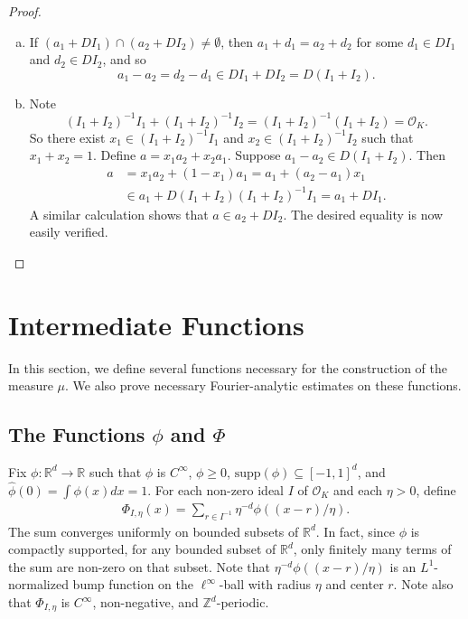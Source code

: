 \documentclass{amsart}
\numberwithin{equation}{section}
\theoremstyle{definition}
\theoremstyle{definition}
\def\RR{\mathbb{R}}
\def\ZZ{\mathbb{Z}}
\def\supp{\mathrm{supp}}
\newcommand{\OK}{\mathcal{O}_K}
\begin{document}
\begin{proof}
\mbox{}\\
\begin{enumerate}[(a)]
    \item 
If $(a_1 + D I_1) \cap (a_2 + D I_2) \neq \emptyset$, then $a_1 + d_1 = a_2 + d_2$ for some $d_1 \in DI_1$ and $d_2 \in DI_2$, and so 
$$
a_1 - a_2 = d_2 - d_1 \in DI_1 + DI_2 = D(I_1 + I_2). 
$$
\item 
Note 
$$
(I_1 + I_2)^{-1}I_1 + (I_1 + I_2)^{-1}I_2 = (I_1 + I_2)^{-1} (I_1 + I_2) = \OK.$$ 
So there exist $x_1 \in (I_1 + I_2)^{-1}I_1$ and $x_2 \in (I_1 + I_2)^{-1}I_2$ such that $x_1+x_2=1$. 
Define $a = x_1a_2 + x_2a_1$. 
Suppose $a_1 - a_2 \in D(I_1 + I_2)$. 
Then 
\begin{align*}
a &= x_1a_2 + (1-x_1)a_1 = a_1 + (a_2 - a_1)x_1 
\\
&\in
a_1 + D(I_1 + I_2)(I_1 + I_2)^{-1}I_1
=
a_1 + DI_1. 
\end{align*}
A similar calculation shows that $a \in a_2 + DI_2$. The desired equality is now easily verified.
\end{enumerate}
\end{proof}





\section{Intermediate  Functions}\label{sec_Single-
Scale}

In this section, we define several functions necessary for the construction of the measure $\mu$. We also prove necessary Fourier-analytic estimates on these functions. 





\subsection{The Functions \texorpdfstring{$\phi$}{phi} and \texorpdfstring{$\Phi$}{Phi}}


Fix $\phi: \RR^d \to \RR$ such that $\phi$ is $C^{\infty}$, $\phi \geq 0$, $\supp(\phi) \subseteq [-1,1]^d$, and 
$\widehat{\phi}(0) = \int \phi(x) dx = 1$. For each non-zero ideal $I$ of $\OK$ and each $\eta > 0$, define 
\begin{align}\label{Phi defn}
\Phi_{I,\eta}(x) = \sum_{r \in I^{-1}} \eta^{-d} \phi((x-r)/\eta). 
\end{align}
The sum converges uniformly on bounded subsets of $\RR^d$. 
In fact, since $\phi$ is compactly supported, for any bounded subset of $\RR^d$, only finitely many terms of the sum are non-zero on that subset. 
Note that $\eta^{-d} \phi ((x-r)/\eta)$ is an $L^1$-normalized bump function on the 
$\ell^{\infty}$-ball with radius $\eta$ and center $r$. 
Note also that $\Phi_{I,\eta}$ is $C^{\infty}$, non-negative, and $\ZZ^d$-periodic. 
\end{document}
